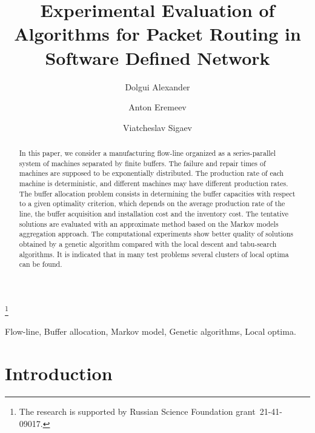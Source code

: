 \documentclass{ifacconf}
\begin{document}
\begin{frontmatter}

\title{Experimental Evaluation of Algorithms for Packet Routing in Software Defined Network} 

\thanks[footnoteinfo]{The research is supported by Russian Science Foundation  grant~21-41-09017.}

\author[First]{Dolgui Alexander} 
\author[Second]{Anton Eremeev} 
\author[Third]{Viatcheslav Sigaev}

\address[First]{Sobolev Institute of Mathematics SB RAS, Novosibirsk, Russia 
(e-mail: eremeev@ofim.oscsbras.ru).}
\address[Second]{Yaliny Research and Development Center,  Moscow, Russia }
\address[Third]{Yaliny Research and Development Center,  Moscow, Russia }


\begin{abstract}                %
In this paper, we consider a manufacturing flow-line
organized as a series-parallel system of machines separated by
finite buffers. The failure and repair times of machines are
supposed to be exponentially distributed. The production rate of
each machine is deterministic, and different machines may have
different production rates. The buffer allocation problem consists
in determining the buffer capacities with respect to a given
optimality criterion, which depends on the average production rate
of the line, the buffer acquisition and installation cost and the
inventory cost. The tentative solutions are evaluated with an
approximate method based on the Markov models aggregation
approach. The computational experiments show better quality of
solutions obtained by a genetic algorithm compared with the local
descent and tabu-search algorithms. It is indicated that in many
test problems several clusters of local optima can be found.
\end{abstract}

\begin{keyword}
Flow-line, Buffer allocation, Markov model, Genetic algorithms, Local optima.
\end{keyword}

\end{frontmatter}

\section{Introduction}
\end{document}
